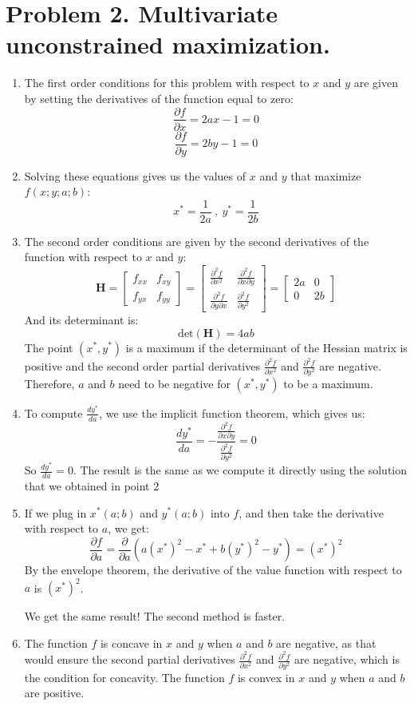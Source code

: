 \documentclass[UTF8,titlepage]{article}
\numberwithin{figure}{section}
\begin{document}
\clearpage
\section{Problem 2. Multivariate unconstrained maximization.}
\begin{enumerate}
    \item The first order conditions for this problem with respect to $x$ and $y$ are given by setting the derivatives of the function equal to zero:
    \[\frac{\partial f}{\partial x} = 2ax - 1 = 0 \]
    \[\frac{\partial f}{\partial y} = 2by - 1 = 0 \]
    \item Solving these equations gives us the values of $x$ and $y$ that maximize $f(x; y; a; b)$:
    \[x^* = \frac{1}{2a}\ ,\  y^* = \frac{1}{2b}\]
    \item The second order conditions are given by the second derivatives of the function with respect to $x$ and $y$:
    \[\mathbf{H} = \begin{bmatrix} f_{xx} & f_{xy} \\ f_{yx} & f_{yy} \end{bmatrix} = \begin{bmatrix} \frac{\partial^2 f}{\partial x^2} & \frac{\partial^2 f}{\partial x \partial y} \\ \frac{\partial^2 f}{\partial y \partial x} & \frac{\partial^2 f}{\partial y^2} \end{bmatrix} = \begin{bmatrix} 2a & 0 \\ 0 & 2b \end{bmatrix}\]
    And its determinant is:
    \[\text{det}(\mathbf{H}) = 4ab\]
    The point $(x^*, y^*)$ is a maximum if the determinant of the Hessian matrix is positive and the second order partial derivatives $\frac{\partial^2 f}{\partial x^2}$ and $\frac{\partial^2 f}{\partial y^2}$ are negative. Therefore, $a$ and $b$ need to be negative for $(x^*, y^*)$ to be a maximum.
    \item To compute $\frac{dy^*}{da}$, we use the implicit function theorem, which gives us:
    \[\frac{dy^*}{da} = -\frac{\frac{\partial^2 f}{\partial x \partial y}}{\frac{\partial^2 f}{\partial y^2}} = 0\]
    So $\frac{dy^*}{da} = 0$. The result is the same as we compute it directly using the solution that we obtained in point 2 
    \item If we plug in $x^*(a; b)$ and $y^*(a; b)$ into $f$, and then take the derivative with respect to $a$, we get:
    \[\frac{\partial f}{\partial a} = \frac{\partial}{\partial a}(a(x^*)^2 - x^* + b(y^*)^2 - y^*) = (x^*)^2\]
    By the envelope theorem, the derivative of the value function with respect to $a$ is $(x^*)^2$. 
    
    We get the same result! The second method is faster.
    \item The function $f$ is concave in $x$ and $y$ when $a$ and $b$ are negative, as that would ensure the second partial derivatives $\frac{\partial^2 f}{\partial x^2}$ and $\frac{\partial^2 f}{\partial y^2}$ are negative, which is the condition for concavity. The function $f$ is convex in $x$ and $y$ when $a$ and $b$ are positive.
\end{enumerate}
\clearpage
\end{document}
